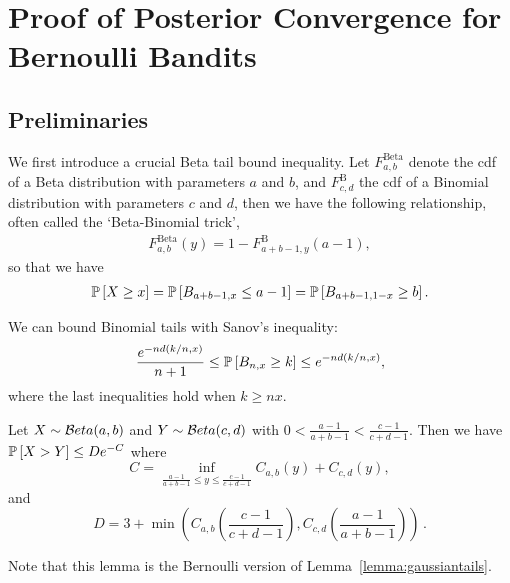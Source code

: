 \section{Proof of Posterior Convergence for Bernoulli Bandits}\label{app:posterior_beta}

\subsection{Preliminaries}\label{app:posterior_beta.pre}

We first introduce a crucial Beta tail bound inequality. Let $F^{\text{Beta}}_{a,b}$ denote the cdf of a Beta distribution with parameters $a$ and $b$, and $F^{\text{B}}_{c,d}$ the cdf of a Binomial distribution with parameters $c$ and $d$, then we have the following relationship, often called the `Beta-Binomial trick',
\begin{align*}
F^{\text{Beta}}_{a,b}(y) = 1 - F^{\text{B}}_{a+b-1, y} (a-1), 
\end{align*}
so that we have
\begin{align*}
\mathbb{P}\left[X \geq x\right] = \mathbb{P}\left[B_{a+b-1,x}  \leq a-1 \right] = \mathbb{P}\left[B_{a+b-1,1-x} \geq b\right].
\end{align*}

We can bound Binomial tails with Sanov's inequality:
\begin{align*}
    \frac{ e^{-n d \left( k / n, x \right)}  }{n+1} \leq \mathbb{P}\left[B_{n,x} \geq k\right] \leq e^{-n d \left( k / n, x \right)},
\end{align*}
where the last inequalities hold when $k \geq nx$.

\begin{lemma}\label{lemma:binomial_tail}
\begin{leftbar}[lemmabar]
Let $X \sim \mathcal{B} eta(a, b)$ and $Y\sim \mathcal{B} eta(c, d)$ with $0 < \frac{a-1}{a+b-1} < \frac{c-1}{c+d-1}$. Then we have $\mathbb{P}\left[X > Y\right] \leq D e^{-C}$ where
\[
    C = \inf_{\frac{a-1}{a+b-1} \leq y \leq \frac{c-1}{c+d-1}} C_{a,b}(y)+C_{c,d}(y),
\]
and
\[
    D = 3 + \min \left( C_{a,b}\left(\frac{c-1}{c+d-1}\right), C_{c,d}\left(\frac{a-1}{a+b-1}\right) \right)\,.
\]
\end{leftbar}
\end{lemma}
Note that this lemma is the Bernoulli version of Lemma~\ref{lemma:gaussiantails}.

